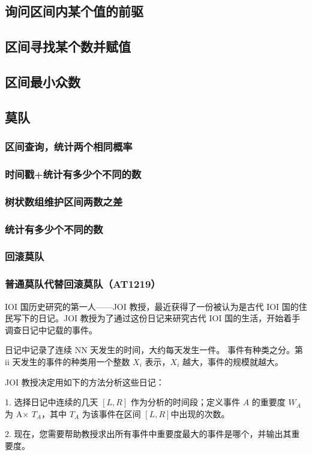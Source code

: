 \documentclass[twoside,a4paper]{article}
\begin{document}
\subsection{询问区间内某个值的前驱}


\subsection{区间寻找某个数并赋值}


\subsection{区间最小众数}


\subsection{莫队}

\subsubsection{区间查询，统计两个相同概率}

\subsubsection{时间戳+统计有多少个不同的数}

\subsubsection{树状数组维护区间两数之差}

\subsubsection{统计有多少个不同的数}

\subsubsection{回滚莫队}

\subsubsection{普通莫队代替回滚莫队（AT1219）}
IOI 国历史研究的第一人——JOI 教授，最近获得了一份被认为是古代 IOI 国的住民写下的日记。JOI 教授为了通过这份日记来研究古代 IOI 国的生活，开始着手调查日记中记载的事件。\par
日记中记录了连续 NN 天发生的时间，大约每天发生一件。
事件有种类之分。第 ii 天发生的事件的种类用一个整数 $X_i$ 表示，$X_i$ 越大，事件的规模就越大。\par
JOI 教授决定用如下的方法分析这些日记：\par
1. 选择日记中连续的几天 $[L,R]$ 作为分析的时间段；定义事件 $A$ 的重要度 $W_A$​ 为 A× $T_{A}$，其中 $T_A$ 为该事件在区间 $[L,R]$中出现的次数。\par
2. 现在，您需要帮助教授求出所有事件中重要度最大的事件是哪个，并输出其重要度。

\end{document}
